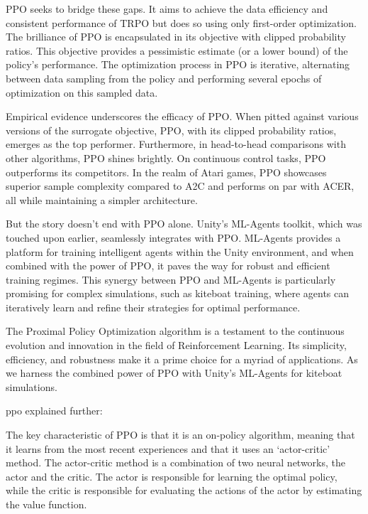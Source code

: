 PPO seeks to bridge these gaps. It aims to achieve the data efficiency and consistent performance of TRPO but does so using only first-order optimization. The brilliance of PPO is encapsulated in its objective with clipped probability ratios. This objective provides a pessimistic estimate (or a lower bound) of the policy's performance. The optimization process in PPO is iterative, alternating between data sampling from the policy and performing several epochs of optimization on this sampled data.

Empirical evidence underscores the efficacy of PPO. When pitted against various versions of the surrogate objective, PPO, with its clipped probability ratios, emerges as the top performer. Furthermore, in head-to-head comparisons with other algorithms, PPO shines brightly. On continuous control tasks, PPO outperforms its competitors. In the realm of Atari games, PPO showcases superior sample complexity compared to A2C and performs on par with ACER, all while maintaining a simpler architecture.

But the story doesn't end with PPO alone. Unity's ML-Agents toolkit, which was touched upon earlier, seamlessly integrates with PPO. ML-Agents provides a platform for training intelligent agents within the Unity environment, and when combined with the power of PPO, it paves the way for robust and efficient training regimes. This synergy between PPO and ML-Agents is particularly promising for complex simulations, such as kiteboat training, where agents can iteratively learn and refine their strategies for optimal performance.

The Proximal Policy Optimization algorithm is a testament to the continuous evolution and innovation in the field of Reinforcement Learning. Its simplicity, efficiency, and robustness make it a prime choice for a myriad of applications. As we harness the combined power of PPO with Unity's ML-Agents for kiteboat simulations.


ppo explained further:

The key characteristic of PPO is that it is an on-policy algorithm, meaning that it learns from the most recent experiences and that it uses an `actor-critic' method. The actor-critic method is a combination of two neural networks, the actor and the critic. The actor is responsible for learning the optimal policy, while the critic is responsible for evaluating the actions of the actor by estimating the value function.  

